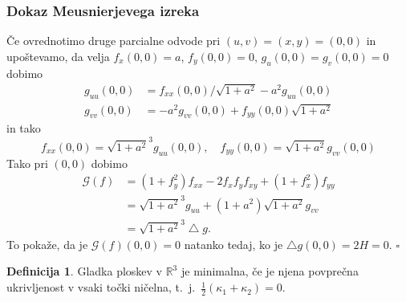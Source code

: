 \documentclass[8pt]{beamer}
\theoremstyle{definition}
\newtheorem{definicija}{Definicija}
\theoremstyle{remark}
\theoremstyle{plain}
\numberwithin{equation}{section}  %
\begin{document}
\begin{frame}
    \frametitle{Dokaz Meusnierjevega izreka}

    Če ovrednotimo druge parcialne odvode pri $(u, v)=(x, y)= (0,0)$ in upoštevamo, da velja $f_x(0,0)=a$, $f_y(0,0)=0$, $g_u(0,0)=g_v(0,0)=0$ dobimo 
    \begin{align*}
        g_{u u}(0,0) & =f_{x x}(0,0) / \sqrt{1+a^2}-a^2 g_{u u}(0,0) \\
        g_{v v}(0,0) & =-a^2 g_{v v}(0,0)+f_{y y}(0,0) \sqrt{1+a^2}
    \end{align*}
    in tako 
    \begin{equation*}
        f_{x x}(0,0)={\sqrt{1+a^2}}^3 g_{u u}(0,0), \quad f_{y y}(0,0)=\sqrt{1+a^2} g_{v v}(0,0)
    \end{equation*}
    \pause 
    Tako pri $(0,0)$ dobimo
    \begin{align*}
        \mathscr{G}(f) & =\left(1+f_y^2\right) f_{x x}-2 f_x f_y f_{x y}+\left(1+f_x^2\right) f_{y y} \\
        & ={\sqrt{1+a^2}}^3 g_{u u}+\left(1+a^2\right) \sqrt{1+a^2} g_{v v} \\
        & ={\sqrt{1+a^2}}^3 \bigtriangleup g .
    \end{align*}
    To pokaže, da je $\mathscr{G}(f)(0,0)=0$ natanko tedaj, ko je $\bigtriangleup g(0,0)=2H=0$. \hfill $\square$
    \pause 
    \begin{definicija}
        Gladka ploskev v $\mathbb{R}^3$ je \textcolor{red1}{minimalna}, če je njena povprečna ukrivljenost v vsaki točki ničelna, t.~j.~$\frac{1}{2}(\kappa_1+\kappa_2)=0$.
    \end{definicija}
\end{frame}
\end{document}

